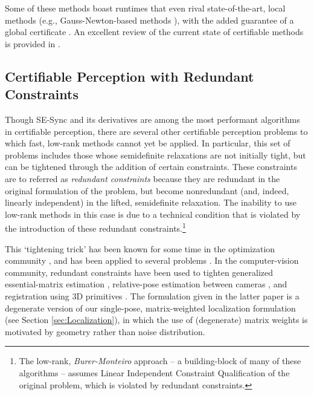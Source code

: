 \documentclass[lettersize,journal]{IEEEtran}
\begin{document}
Some of these methods boast runtimes that even rival state-of-the-art, local methods (e.g., Gauss-Newton-based methods \cite{gtsam}), with the added guarantee of a global certificate \cite{juricComparisonGraphOptimization2021, brialesCartanSyncFastGlobal2017}. An excellent review of the current state of certifiable methods is provided in \cite{rosenAdvancesInferenceRepresentation2021}.

\subsection{Certifiable Perception with Redundant Constraints}\label{sec:RedundantConstraints}

Though SE-Sync and its derivatives are among the most performant algorithms in certifiable perception, there are several other certifiable perception problems to which fast, low-rank methods cannot yet be applied. In particular, this set of problems includes those whose semidefinite relaxations are not initially tight, but can be tightened through the addition of certain constraints. These constraints are to referred as \emph{redundant constraints} because they are redundant in the original formulation of the problem, but become nonredundant (and, indeed, linearly independent) in the lifted, semidefinite relaxation. The inability to use low-rank methods in this case is due to a technical condition that is violated by the introduction of these redundant constraints.\footnote{The low-rank, \emph{Burer-Monteiro} approach -- a building-block of many of these algorithms -- assumes Linear Independent Constraint Qualification of the original problem, which is violated by redundant constraints.}

This `tightening trick' has been known for some time in the optimization community \cite{nesterovSemidefiniteProgrammingRelaxations2000}, and has been applied to several problems \cite{ruizUsingRedundancyStrengthen2011, parriloSemidefiniteProgrammingRelaxations2003a}. In the computer-vision community, redundant constraints have been used to tighten generalized essential-matrix estimation \cite{zhaoCertifiablyGloballyOptimal2020}, relative-pose estimation between cameras \cite{garcia-salgueroTighterRelaxationRelative2022, brialesCertifiablyGloballyOptimal2018}, and registration using 3D primitives \cite{brialesConvexGlobal3D2017}. The formulation given in the latter paper is a degenerate version of our single-pose, matrix-weighted localization formulation (see Section \ref{sec:Localization}), in which the use of (degenerate) matrix weights is motivated by geometry rather than noise distribution. 
\end{document}
